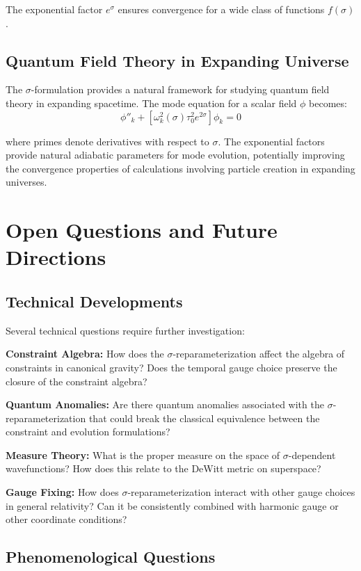 \documentclass[12pt,a4paper]{article}
\begin{document}
The exponential factor $e^{\sigma}$ ensures convergence for a wide class of functions $f(\sigma)$.

\subsection{Quantum Field Theory in Expanding Universe}

The $\sigma$-formulation provides a natural framework for studying quantum field theory in expanding spacetime. The mode equation for a scalar field $\phi$ becomes:
\begin{equation}
\phi''_k + \left[\omega_k^2(\sigma) \tau_0^2 e^{2\sigma}\right] \phi_k = 0
\end{equation}

where primes denote derivatives with respect to $\sigma$. The exponential factors provide natural adiabatic parameters for mode evolution, potentially improving the convergence properties of calculations involving particle creation in expanding universes.

\section{Open Questions and Future Directions}

\subsection{Technical Developments}

Several technical questions require further investigation:

\textbf{Constraint Algebra:} How does the $\sigma$-reparameterization affect the algebra of constraints in canonical gravity? Does the temporal gauge choice preserve the closure of the constraint algebra?

\textbf{Quantum Anomalies:} Are there quantum anomalies associated with the $\sigma$-reparameterization that could break the classical equivalence between the constraint and evolution formulations?

\textbf{Measure Theory:} What is the proper measure on the space of $\sigma$-dependent wavefunctions? How does this relate to the DeWitt metric on superspace?

\textbf{Gauge Fixing:} How does $\sigma$-reparameterization interact with other gauge choices in general relativity? Can it be consistently combined with harmonic gauge or other coordinate conditions?

\subsection{Phenomenological Questions}
\end{document}
